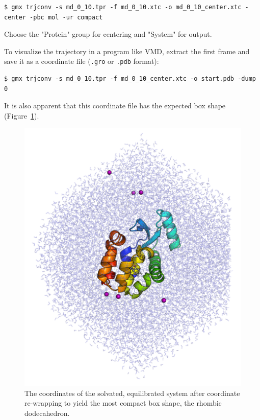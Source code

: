 \documentclass[9pt,tutorial,pubversion]{livecoms}
\begin{document}
\begin{lstlisting}
$ gmx trjconv -s md_0_10.tpr -f md_0_10.xtc -o md_0_10_center.xtc -center -pbc mol -ur compact
\end{lstlisting}
%
Choose the "Protein" group for centering  and "System" for output.

To visualize the trajectory in a program like VMD, extract the first frame and save it as a coordinate file (\texttt{.gro} or \texttt{.pdb} format):

\begin{lstlisting}
$ gmx trjconv -s md_0_10.tpr -f md_0_10_center.xtc -o start.pdb -dump 0
\end{lstlisting}
%
It is also apparent that this coordinate file has the expected box shape (Figure~\ref{3htb_t0_rewrap_fig}).

\begin{figure}[h!]
\centering
\includegraphics{3htb_t0_rewrap}
\caption{The coordinates of the solvated, equilibrated system after coordinate re-wrapping to yield the most compact box shape, the rhombic dodecahedron.}
\label{3htb_t0_rewrap_fig}
\end{figure}
\end{document}
